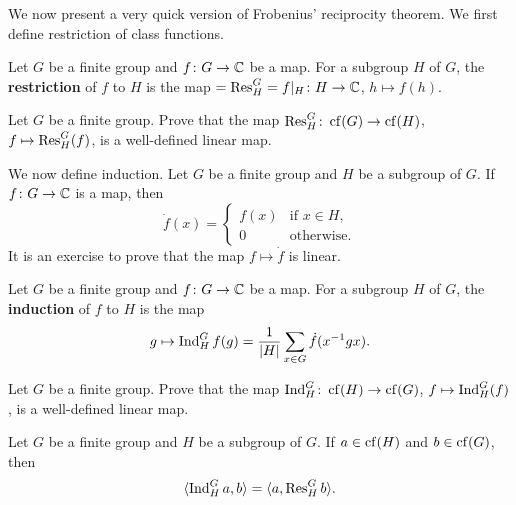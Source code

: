 
We now present a very quick version of Frobenius'
reciprocity theorem. We first 
define restriction of class functions. 

\begin{definition}
    Let $G$ be a finite group and $f\colon G\to\mathbb{C}$ be
    a map. For a subgroup $H$ of $G$, the \textbf{restriction}
    of $f$ to $H$ is the map 
    $=\operatorname{Res}_H^G=f|_H\colon H\to\mathbb{C}$, $h\mapsto f(h)$. 
\end{definition}

\begin{exercise}
\label{xca:restriction}
    Let $G$ be a finite group. Prove that
    the map $\operatorname{Res}_H^G\colon\operatorname{cf}(G)\to\operatorname{cf}(H)$, $f\mapsto\operatorname{Res}_H^G(f)$, 
    is a well-defined linear map. 
\end{exercise}

We now define induction. Let $G$ be a finite group
and $H$ be a subgroup of $G$. If $f\colon G\to\mathbb{C}$ is a map, 
then 
\[
\dot{f}(x)=\begin{cases}
    f(x) & \text{if $x\in H$},\\
    0 & \text{otherwise}.
    \end{cases}
\]
It is an exercise to prove that
the map $f\mapsto\dot{f}$ is linear. 

\begin{definition}
    Let $G$ be a finite group and $f\colon G\to\mathbb{C}$ be
    a map. For a subgroup $H$ of $G$, the \textbf{induction}
    of $f$ to $H$ is the map 
    \begin{align*}
      g\mapsto\operatorname{Ind}_H^Gf(g)=\frac{1}{|H|}\sum_{x\in G}\dot{f}(x^{-1}gx).
    \end{align*}
\end{definition}

\begin{exercise}
\label{xca:induction}
    Let $G$ be a finite group. Prove that
    the map $\operatorname{Ind}_H^G\colon\operatorname{cf}(H)\to\operatorname{cf}(G)$, $f\mapsto\operatorname{Ind}_H^G(f)$, 
    is a well-defined linear map. 
\end{exercise}

\begin{theorem}
    Let $G$ be a finite group and $H$ be a subgroup of $G$. 
    If $a\in\operatorname{cf}(H)$ and $b\in\operatorname{cf}(G)$, then
    \[
    \langle\operatorname{Ind}_H^Ga,b\rangle=\langle a,\operatorname{Res}_H^Gb\rangle.
    \]
\end{theorem}

